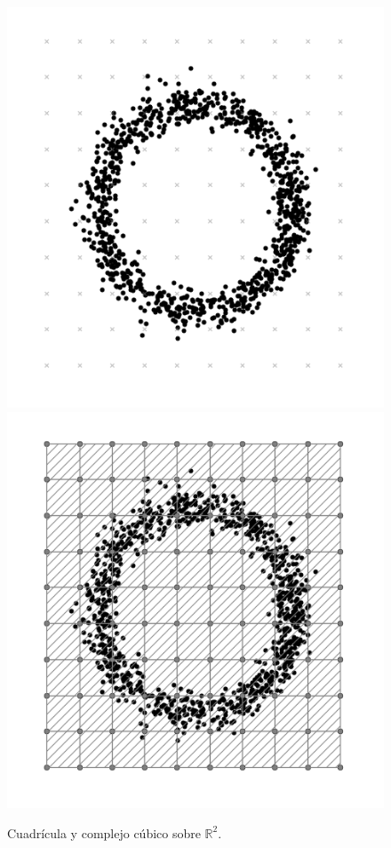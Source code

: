 \documentclass[12pt,a4paper,twoside]{article} %
\theoremstyle{plain}
\theoremstyle{definition}
\newcommand{\R}{\mathbb{R}}
\begin{document}
\begin{figure}[h!]
\centering
\includegraphics[scale=0.45]{img/grid.png}
\includegraphics[scale=0.45]{img/complexandcloud.png}
\caption{Cuadrícula y complejo cúbico sobre $\R^2$.}
\label{grid}
\end{figure}
\end{document}
